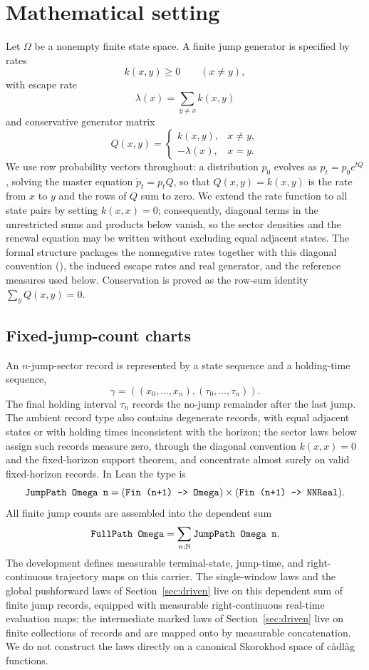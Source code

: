 \section{Mathematical setting}
\label{sec:setting}

Let $\Omega$ be a nonempty finite state space. A finite jump generator is specified by rates
\[
  k(x,y) \ge 0 \qquad (x\ne y),
\]
with escape rate
\[
  \lambda(x)=\sum_{y\ne x} k(x,y)
\]
and conservative generator matrix
\[
  Q(x,y)=
  \begin{cases}
    k(x,y), & x\ne y,\\
    -\lambda(x), & x=y.
  \end{cases}
\]
We use row probability vectors throughout: a distribution $p_0$ evolves as $p_t=p_0e^{tQ}$, solving the master equation $\dot p_t=p_tQ$, so that $Q(x,y)=k(x,y)$ is the rate from $x$ to $y$ and the rows of $Q$ sum to zero. We extend the rate function to all state pairs by setting $k(x,x)=0$; consequently, diagonal terms in the unrestricted sums and products below vanish, so the sector densities and the renewal equation may be written without excluding equal adjacent states. The formal structure  packages the nonnegative rates together with this diagonal convention (), the induced escape rates and real generator, and the reference measures used below. Conservation is proved as the row-sum identity $\sum_y Q(x,y)=0$.

\subsection{Fixed-jump-count charts}

An $n$-jump-sector record is represented by a state sequence and a holding-time sequence,
\[
  \gamma=((x_0,\ldots,x_n),(\tau_0,\ldots,\tau_n)).
\]
The final holding interval $\tau_n$ records the no-jump remainder after the last jump. The ambient record type also contains degenerate records, with equal adjacent states or with holding times inconsistent with the horizon; the sector laws below assign such records measure zero, through the diagonal convention $k(x,x)=0$ and the fixed-horizon support theorem, and concentrate almost surely on valid fixed-horizon records. In Lean the type is
\[
  \lean{JumpPath Omega n}
  = (\lean{Fin (n+1) -> Omega})\times
    (\lean{Fin (n+1) -> NNReal}).
\]
All finite jump counts are assembled into the dependent sum
\[
  \lean{FullPath Omega}=\sum_{n:\mathbb{N}} \lean{JumpPath Omega n}.
\]
The development defines measurable terminal-state, jump-time, and right-continuous trajectory maps on this carrier. The single-window laws and the global pushforward laws of Section~\ref{sec:driven} live on this dependent sum of finite jump records, equipped with measurable right-continuous real-time evaluation maps; the intermediate marked laws of Section~\ref{sec:driven} live on finite collections of  records and are mapped onto  by measurable concatenation. We do not construct the laws directly on a canonical Skorokhod space of c\`adl\`ag functions.

